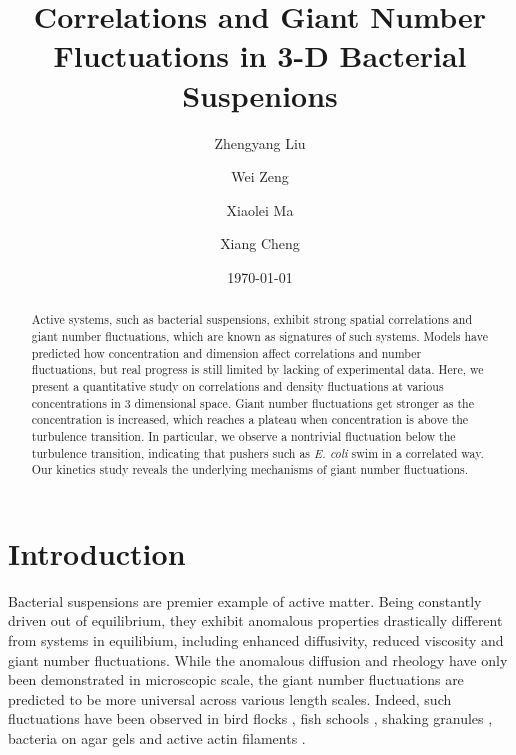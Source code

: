 \documentclass[twocolumn,aps,pre,amsmath,amssymb,floatfix,longbibliography]{revtex4-1}
\begin{document}
\title{Correlations and Giant Number Fluctuations in 3-D Bacterial Suspenions}

\author{Zhengyang Liu}
\author{Wei Zeng}
\author{Xiaolei Ma}
\author{Xiang Cheng}



\date{\today}

\begin{abstract}
Active systems, such as bacterial suspensions, exhibit strong spatial correlations and giant number fluctuations, which are known as signatures of such systems. Models have predicted how concentration and dimension affect correlations and number fluctuations, but real progress is still limited by lacking of experimental data. Here, we present a quantitative study on correlations and density fluctuations at various concentrations in 3 dimensional space. Giant number fluctuations get stronger as the concentration is increased, which reaches a plateau when concentration is above the turbulence transition. In particular, we observe a nontrivial fluctuation below the turbulence transition, indicating that pushers such as \textit{E. coli} swim in a correlated way. Our kinetics study reveals the underlying mechanisms of giant number fluctuations.
\end{abstract}

\maketitle
\section{Introduction}

Bacterial suspensions are premier example of active matter. Being constantly driven out of equilibrium, they exhibit anomalous properties drastically different from systems in equilibium, including enhanced diffusivity, reduced viscosity and giant number fluctuations. While the anomalous diffusion and rheology have only been demonstrated in microscopic scale, the giant number fluctuations are predicted to be more universal across various length scales. Indeed, such fluctuations have been observed in bird flocks \cite{Ballerini1232}, fish schools \cite{Ward6948}, shaking granules \cite{Narayan105}, bacteria on agar gels \cite{Zhang13626} and active actin filaments \cite{Schaller4488}.
\end{document}
